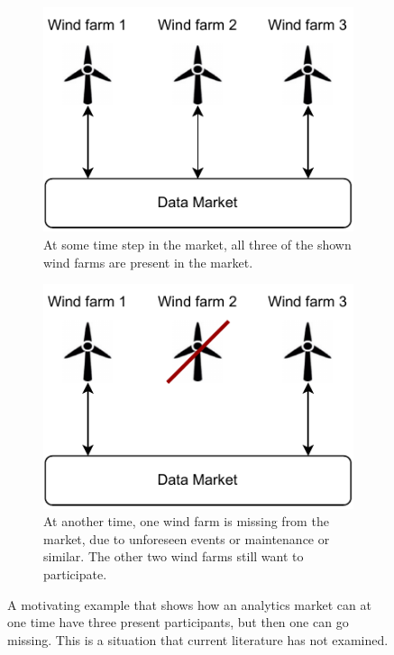 \begin{figure}
  \centering
  \begin{subfigure}{.4\textwidth}
    \centering
    \includegraphics[width=.8\linewidth]{Pictures/data_market_3_wind_farms.pdf}
    \caption{At some time step in the market, all three of the shown wind farms
    are present in the market.}
  \end{subfigure}%
  \hspace{1em}
\begin{subfigure}{.4\textwidth}
  \centering
  \includegraphics[width=.8\linewidth]{Pictures/data_market_3_wind_farms_missing.pdf}
  \caption{At another time, one wind farm is missing from the market, due to
  unforeseen events or maintenance or similar. The other two wind farms still
  want to participate.}
\end{subfigure}%
  \caption{A motivating example that shows how an analytics market can at one
  time have three present participants, but then one can go missing. This is a
  situation that current literature has not examined.}
  \label{fig:wind_missing}
\end{figure}

